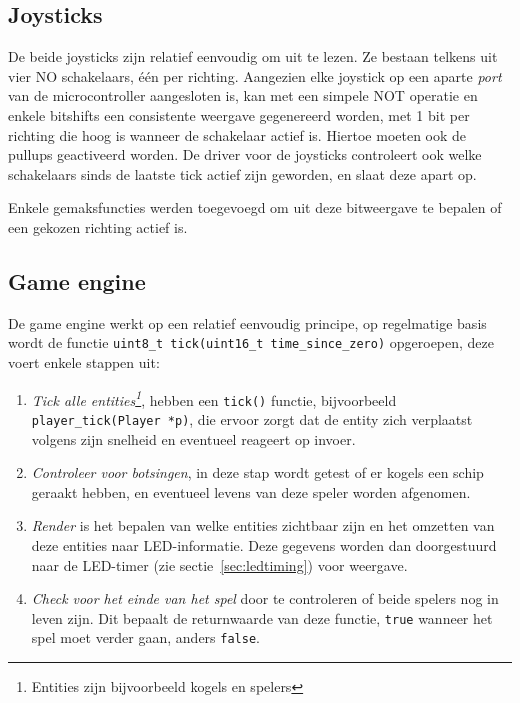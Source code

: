 \documentclass[a4paper, 12pt]{article}
\begin{document}
\subsection{Joysticks}
De beide joysticks zijn relatief eenvoudig om uit te lezen.
Ze bestaan telkens uit vier NO schakelaars, één per richting.
Aangezien elke joystick op een aparte \emph{port} van de microcontroller
aangesloten is, kan met een simpele NOT operatie en enkele bitshifts een
consistente weergave gegenereerd worden, met 1 bit per richting die hoog is
wanneer de schakelaar actief is. Hiertoe moeten ook de pullups geactiveerd
worden. De driver voor de joysticks controleert ook welke schakelaars sinds de
laatste tick actief zijn geworden, en slaat deze apart op.

Enkele gemaksfuncties werden toegevoegd om uit deze bitweergave te bepalen of
een gekozen richting actief is.

\subsection{Game engine}
De game engine werkt op een relatief eenvoudig principe,
op regelmatige basis wordt de functie \texttt{uint8_t tick(uint16_t time_since_zero)}
opgeroepen,
deze voert enkele stappen uit:
\begin{enumerate}
  \item \emph{Tick alle entities\footnote{Entities zijn bijvoorbeeld kogels en
        spelers}}, hebben een \texttt{tick()} functie, bijvoorbeeld
    \texttt{player_tick(Player *p)}, die ervoor zorgt dat de entity zich
    verplaatst volgens zijn snelheid en eventueel reageert op invoer.

  \item \emph{Controleer voor botsingen}, in deze stap wordt getest of er
    kogels een schip geraakt hebben, en eventueel levens van deze speler worden
    afgenomen.

  \item \emph{Render} is het bepalen van welke entities zichtbaar zijn en het
    omzetten van deze entities naar LED-informatie. Deze gegevens worden dan
    doorgestuurd naar de LED-timer (zie sectie~\ref{sec:ledtiming}) voor weergave.

  \item \emph{Check voor het einde van het spel} door te controleren of beide
    spelers nog in leven zijn. Dit bepaalt de returnwaarde van deze functie,
    \texttt{true} wanneer het spel moet verder gaan, anders \texttt{false}.
\end{enumerate}
\end{document}
